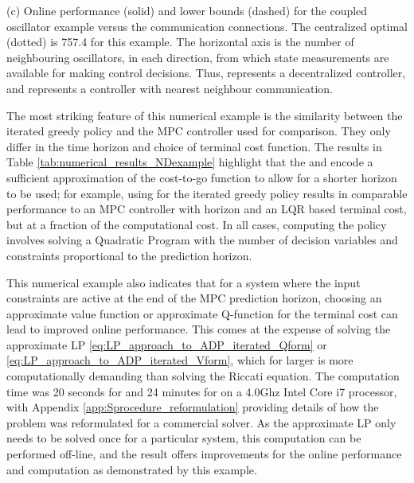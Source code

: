 \documentclass[journal]{IEEEtran}
\newcommand{\textQ}{Q}
\begin{document}
\begin{figure*} [t]
{(c) Online performance (solid) and lower bounds (dashed) for the coupled oscillator example versus the communication connections. The centralized optimal (dotted) is 757.4 for this example. The horizontal axis is the number of neighbouring oscillators, in each direction, from which state measurements are available for making control decisions. Thus,  represents a decentralized controller, and  represents a controller with nearest neighbour communication.
	}
	\label{fig:smd}
\end{figure*}















The most striking feature of this numerical example is the similarity between the iterated greedy policy and the MPC controller used for comparison. They only differ in the time horizon and choice of terminal cost function. The results in Table \ref{tab:numerical_results_NDexample} highlight that the  and  encode a sufficient approximation of the cost-to-go function to allow for a shorter horizon to be used; for example, using  for the iterated greedy policy results in comparable performance to an MPC controller with horizon  and an LQR based terminal cost, but at a fraction of the computational cost. In all cases, computing the policy involves solving a Quadratic Program with the number of decision variables and constraints proportional to the prediction horizon.



This numerical example also indicates that for a system where the input constraints are active at the end of the MPC prediction horizon, choosing an approximate value function or approximate \textQ-function for the terminal cost can lead to improved online performance. This comes at the expense of solving the approximate LP \eqref{eq:LP_approach_to_ADP_iterated_Qform} or \eqref{eq:LP_approach_to_ADP_iterated_Vform}, which for larger  is more computationally demanding than solving the Riccati equation.
The computation time was 20 seconds for  and 24 minutes for  on a 4.0Ghz Intel Core i7 processor, with Appendix \ref{app:Sprocedure_reformulation} providing details of how the problem was reformulated for a commercial solver.
As the approximate LP only needs to be solved once for a particular system, this computation can be performed off-line, and the result offers improvements for the online performance and computation as demonstrated by this example.
\end{document}
